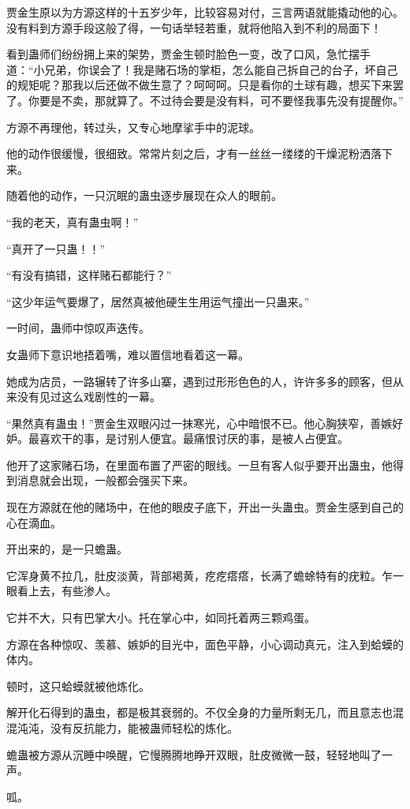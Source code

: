 \begin{this_body}
贾金生原以为方源这样的十五岁少年，比较容易对付，三言两语就能撬动他的心。没有料到方源手段这般了得，一句话举轻若重，就将他陷入到不利的局面下！

看到蛊师们纷纷拥上来的架势，贾金生顿时脸色一变，改了口风，急忙摆手道：“小兄弟，你误会了！我是赌石场的掌柜，怎么能自己拆自己的台子，坏自己的规矩呢？那我以后还做不做生意了？呵呵呵。只是看你的土球有趣，想买下来罢了。你要是不卖，那就算了。不过待会要是没有料，可不要怪我事先没有提醒你。”

方源不再理他，转过头，又专心地摩挲手中的泥球。

他的动作很缓慢，很细致。常常片刻之后，才有一丝丝一缕缕的干燥泥粉洒落下来。

随着他的动作，一只沉眠的蛊虫逐步展现在众人的眼前。

“我的老天，真有蛊虫啊！”

“真开了一只蛊！！”

“有没有搞错，这样赌石都能行？”

“这少年运气要爆了，居然真被他硬生生用运气撞出一只蛊来。”

一时间，蛊师中惊叹声迭传。

女蛊师下意识地捂着嘴，难以置信地看着这一幕。

她成为店员，一路辗转了许多山寨，遇到过形形色色的人，许许多多的顾客，但从来没有见过这么戏剧性的一幕。

“果然真有蛊虫！”贾金生双眼闪过一抹寒光，心中暗恨不已。他心胸狭窄，善嫉好妒。最喜欢干的事，是讨别人便宜。最痛恨讨厌的事，是被人占便宜。

他开了这家赌石场，在里面布置了严密的眼线。一旦有客人似乎要开出蛊虫，他得到消息就会出现，一般都会强买下来。

现在方源就在他的赌场中，在他的眼皮子底下，开出一头蛊虫。贾金生感到自己的心在滴血。

开出来的，是一只蟾蛊。

它浑身黄不拉几，肚皮淡黄，背部褐黄，疙疙瘩瘩，长满了蟾蜍特有的疣粒。乍一眼看上去，有些渗人。

它并不大，只有巴掌大小。托在掌心中，如同托着两三颗鸡蛋。

方源在各种惊叹、羡慕、嫉妒的目光中，面色平静，小心调动真元，注入到蛤蟆的体内。

顿时，这只蛤蟆就被他炼化。

解开化石得到的蛊虫，都是极其衰弱的。不仅全身的力量所剩无几，而且意志也混混沌沌，没有反抗能力，能被蛊师轻松的炼化。

蟾蛊被方源从沉睡中唤醒，它慢腾腾地睁开双眼，肚皮微微一鼓，轻轻地叫了一声。

呱。


\end{this_body}
